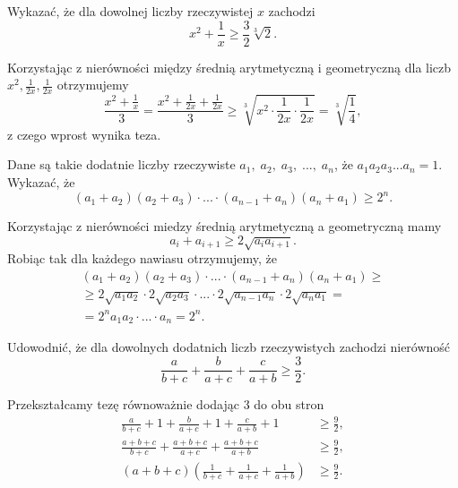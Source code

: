 \newpage
{}

\begin{problem}{1} 
	Wykazać, że dla dowolnej liczby rzeczywistej $x$ zachodzi
	\[
		x^2 + \frac{1}{x} \geqslant \frac{3}{2}\sqrt[3]{2}.
	\]
\end{problem}

\vspace{5px}

\noindent
Korzystając z nierówności między średnią arytmetyczną i geometryczną dla liczb $x^2, \frac{1}{2x}, \frac{1}{2x}$ otrzymujemy
\[
	\frac{x^2 + \frac{1}{x}}{3} = \frac{x^2 + \frac{1}{2x} + \frac{1}{2x}}{3} \geqslant \sqrt[3]{x^2 \cdot \frac{1}{2x} \cdot \frac{1}{2x}} = \sqrt[3]{\frac{1}{4}},
\]
z czego wprost wynika teza.

\vspace{5px}

\begin{problem}{2} 
	Dane są takie dodatnie liczby rzeczywiste $a_1, \;a_2,\; a_3,\; ...,\; a_n$, że $a_1a_2a_3...a_n = 1$. Wykazać, że
	\[
		(a_1 + a_2)(a_2 + a_3)\cdot ... \cdot (a_{n-1} + a_n)(a_n + a_1) \geqslant 2^n.
	\]
\end{problem}

\vspace{5px}

\noindent
Korzystając z nierówności miedzy średnią arytmetyczną a geometryczną mamy
\[
	a_i + a_{i + 1} \geqslant 2\sqrt{a_ia_{i + 1}}.
\]
Robiąc tak dla każdego nawiasu otrzymujemy, że
\begin{multline*}
	(a_1 + a_2)(a_2 + a_3)\cdot ... \cdot (a_{n-1} + a_n)(a_n + a_1) \geqslant \\
	\geqslant 2\sqrt{a_1a_{2}} \cdot 2\sqrt{a_2a_{3}} \cdot ... \cdot 2\sqrt{a_{n-1}a_{n}}\cdot 2\sqrt{a_na_{1}}  = \\
	= 2^n a_1a_2\cdot ... \cdot a_n = 2^n.
\end{multline*}

\begin{problem}{3} 
	Udowodnić, że dla dowolnych dodatnich liczb rzeczywistych zachodzi nierówność
	\[
		\frac{a}{b + c} + \frac{b}{a + c} + \frac{c}{a + b} \geqslant \frac{3}{2}.
	\]
\end{problem}

\vspace{5px}

\noindent
Przekształcamy tezę równoważnie dodając $3$ do obu stron
\begin{align*}
	\frac{a}{b + c} + 1 + \frac{b}{a + c} + 1 + \frac{c}{a + b} + 1 &\geqslant \frac{9}{2}, \\
	\frac{a + b + c}{b + c} + \frac{a + b + c}{a + c} + \frac{a + b + c}{a + b} &\geqslant \frac{9}{2}, \\
	\left(a + b + c\right)\left(\frac{1}{b + c} + \frac{1}{a + c} + \frac{1}{a + b}\right) &\geqslant \frac{9}{2}.
\end{align*}


